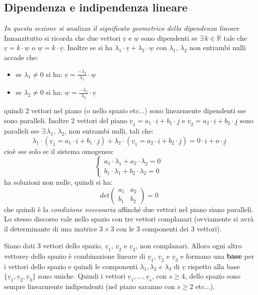 \documentclass[a4paper,12pt, oneside]{book}
\begin{document}
\subsection{Dipendenza e indipendenza lineare}
\textit{In questa sezione si analizza il significato geometrico della dipendenza lineare}\\
Innanzitutto si ricorda che due vettori $\underline{v}$ e $\underline{w}$ sono dipendenti se $\exists \,k\in\mathbb{R}$ tale che $\underline{v}=k\cdot \underline{w}$ o $\underline{w}=k\cdot \underline{v}$. Inoltre se si ha $\lambda_1\cdot \underline{v}+\lambda_2\cdot \underline{w}$ con $\lambda_1,\,\lambda_2$ non entrambi nulli accade che:
\begin{itemize}
	\item se $\lambda_1\neq 0$ si ha: $\underline{v}=\frac{-\lambda_2}{\lambda_1}\cdot \underline{w}$
	\item se $\lambda_2\neq 0$ si ha: $\underline{w}=\frac{-\lambda_1}{\lambda_2}\cdot \underline{v}$
\end{itemize}
quindi 2 vettori nel piano (o nello spazio etc...) sono linearmente dipendenti sse sono paralleli.
Inoltre 2 vettori del piano $\underline{v}_1=a_1\cdot \underline{i}+b_1\cdot \underline{j}$ e $\underline{v}_2=a_2\cdot \underline{i}+b_2\cdot \underline{j}$ sono paralleli sse $\exists \,\lambda_1,\,\lambda_2$, non entrambi nulli, tali che:
$$\lambda_1\cdot (\underline{v}_1=a_1\cdot \underline{i}+b_1\cdot \underline{j})+\lambda_2\cdot (\underline{v}_1=a_2\cdot \underline{i}+b_2\cdot \underline{j})=0\cdot \underline{i}+o\cdot \underline{j}$$
cioè sse solo se il sistema omogeneo:
$$\begin{cases}
		a_1\cdot \lambda_1+a_2\cdot \lambda_2=0 \\
		b_1\cdot \lambda_1+b_2\cdot \lambda_2=0
	\end{cases}$$
ha soluzioni non nulle, quindi si ha:
$$
	det\left(\begin{matrix}
			a_1 & a_2 \\
			b_1 & b_2
		\end{matrix}\right)=0
$$
che quindi è la\textit{ condizione necessaria} affinché due vettori nel piano siano paralleli.\\ Lo stesso discorso vale nello spazio con tre vettori complanari (ovviamente si avrà il determinante di una matrice $3\times 3$ con le 3 componenti dei 3 vettori).
\begin{teorema}
	Siano dati 3 vettori dello spazio, $\underline{v}_1$, $\underline{v}_2$ e $\underline{v}_3$, non complanari. Allora ogni altro vettore$\underline{v}$ dello spazio è combinazione lineare di $\underline{v}_1$, $\underline{v}_2$ e $\underline{v}_3$ e formano una \textbf{base} per i vettori dello spazio e quindi le componenti $\lambda_1,\lambda_2\,\, e \,\, \lambda_3$ di $\underline{v}$ rispetto alla base $\{\underline{v}_1,\underline{v}_2,\underline{v}_3\}$ sono uniche. Quindi i vettori $\underline{v}_1,...,\underline{v}_s$, con $s\geq 4$, dello spazio sono sempre linearmente indipendenti (nel piano saranno con $s\geq 2$ etc...).
\end{teorema}
\end{document}
